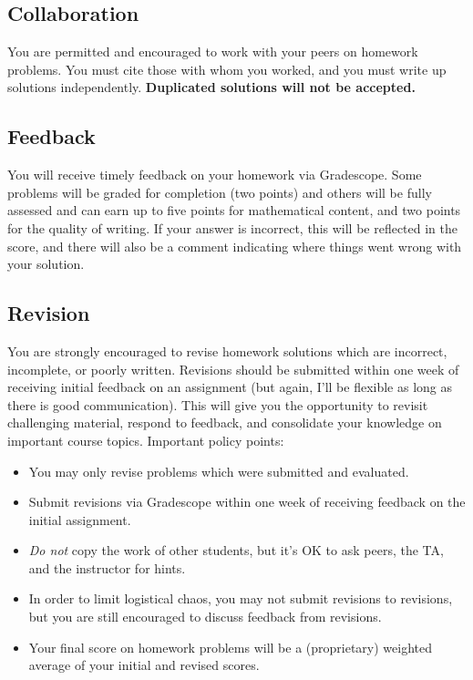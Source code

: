 \documentclass[11pt,twoside]{amsart}
\begin{document}
\subsection*{Collaboration}
You are permitted and encouraged to work with your peers on homework problems.  You must cite those with whom you worked, and you must write up solutions independently.  \textbf{Duplicated solutions will not be accepted.}

\subsection*{Feedback}
You will receive timely feedback on your homework via Gradescope.  Some problems will be graded for completion (two points) and others will be fully assessed and can earn up to five points for mathematical content, and two points for the quality of writing.  If your answer is incorrect, this will be reflected in the score, and there will also be a comment indicating where things went wrong with your solution.

\subsection*{Revision}
You are strongly encouraged to revise homework solutions which are incorrect, incomplete, or poorly written. Revisions should be submitted within one week of receiving initial feedback on an assignment (but again, I'll be flexible as long as there is good communication). This will give you the opportunity to revisit challenging material, respond to feedback, and consolidate your knowledge on important course topics. Important policy points:
\begin{itemize}
\item You may only revise problems which were submitted and evaluated.
\item Submit revisions via Gradescope within one week of receiving feedback on the initial assignment.
\item \emph{Do not} copy the work of other students, but it's OK to ask peers, the TA, and the instructor for hints.
\item In order to limit logistical chaos, you may not submit revisions to revisions, but you are still encouraged to discuss feedback from revisions.
\item Your final score on homework problems will be a (proprietary) weighted average of your initial and revised scores.
\end{itemize}
\end{document}
